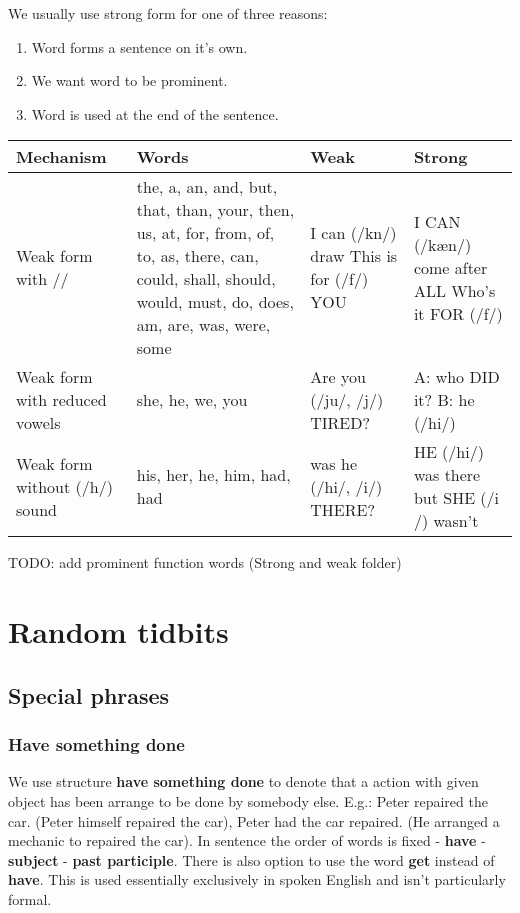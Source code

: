\documentclass[a4paper,12pt]{report}
\begin{document}
We usually use strong form for one of three reasons:
\begin{enumerate}
	\item Word forms a sentence on it's own.
	\item We want word to be prominent.
	\item Word is used at the end of the sentence.
\end{enumerate}

\begin{center}
	\begin{tabular}{| m{4cm} | m{5cm} || m{3cm} | m{3cm} | }
		\hline
		Mechanism & Words & Weak & Strong \\
		\hline
		Weak form with /\textschwa/ & the, a, an, and, but, that, than, your, then, us, at, for, from, of, to, as, there, can, could, shall, should, would, must, do, does, am, are, was, were, some & I can (/k\textschwa n/) draw \newline This is for (/f\textschwa/) YOU & I CAN (/k\ae n/) come after ALL \newline Who's it FOR (/f\textopeno\textlengthmark/)\\
		\hline
		Weak form with reduced vowels & she, he, we, you & Are you (/ju/, /j\textschwa/) TIRED?  & A: who DID it? \newline B: he (/hi\textlengthmark/) \\
		\hline
		Weak form without (/h/) sound & his, her, he, him, had, had & was he (/hi/, /i/) THERE? & HE (/hi\textlengthmark/) was there but SHE (/\textesh i \textlengthmark/) wasn't \\
		\hline
	\end{tabular}
\end{center}

TODO: add prominent function words (Strong and weak folder)


\chapter{Random tidbits}

\section{Special phrases}

\subsection{Have something done}

We use structure \textbf{have something done} to denote that a action with given object has been arrange to be done by somebody else.
E.g.: Peter repaired the car. (Peter himself repaired the car), Peter had the car repaired. (He arranged a mechanic to repaired the car).
In sentence the order of words is fixed - \textbf{have} - \textbf{subject} - \textbf{past participle}.
There is also option to use the word \textbf{get} instead of \textbf{have}. This is used essentially exclusively in spoken English and isn't particularly formal.
\end{document}
